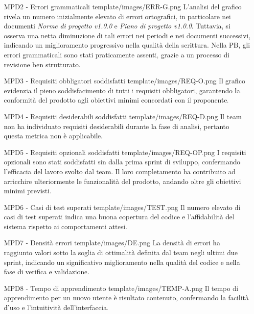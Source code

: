 \Met
{ %
    MPD2 - Errori grammaticali
}
{ %
    template/images/ERR-G.png
}
{ %
    L'analisi del grafico rivela un numero inizialmente elevato di errori ortografici, 
    in particolare nei documenti \textit{Norme di progetto v1.0.0} e \textit{Piano di progetto v1.0.0}.
    Tuttavia, si osserva una netta diminuzione di tali errori nei periodi e nei 
    documenti successivi, indicando un miglioramento progressivo nella qualità della scrittura.
}
{ %
Nella PB, gli errori grammaticali sono stati praticamente assenti, grazie a un processo di revisione ben strutturato.
}

\MetNoPB
{ %
    MPD3 - Requisiti obbligatori soddisfatti     
}
{ %
    template/images/REQ-O.png
}
{   %
    Il grafico evidenzia il pieno soddisfacimento di tutti i requisiti obbligatori, garantendo la conformità del prodotto agli obiettivi minimi concordati con il proponente.
}

\MetNoPB
{ %
    MPD4 - Requisiti desiderabili soddisfatti    
}
{ %
    template/images/REQ-D.png
}
{   %
    Il team non ha individuato requisiti desiderabili durante la fase di analisi, pertanto questa metrica non è applicabile.
}

\MetNoPB
{ %
    MPD5 - Requisiti opzionali soddisfatti    
}
{ %
    template/images/REQ-OP.png
}
{   %
I requisiti opzionali sono stati soddisfatti sin dalla prima sprint di sviluppo, confermando l’efficacia del lavoro svolto dal team. Il loro completamento ha contribuito ad arricchire ulteriormente le funzionalità del prodotto, andando oltre gli obiettivi minimi previsti.
}

\MetNoPB
{ %
    MPD6 - Casi di test superati     
}
{ %
    template/images/TEST.png
}
{   %
    Il numero elevato di casi di test superati indica una buona copertura del codice e l’affidabilità del sistema rispetto ai comportamenti attesi.
}

\MetNoPB
{ %
    MPD7 - Densità errori
}
{ %
    template/images/DE.png
}
{   %
La densità di errori ha raggiunto valori sotto la soglia di ottimalità definita dal team negli ultimi due sprint, indicando un significativo miglioramento nella qualità del codice e nella fase di verifica e validazione.
}

\MetNoPB
{ %
    MPD8 - Tempo di apprendimento    
}
{ %
    template/images/TEMP-A.png
}
{   %
    Il tempo di apprendimento per un nuovo utente è risultato contenuto, confermando la facilità d’uso e l’intuitività dell’interfaccia.
}

